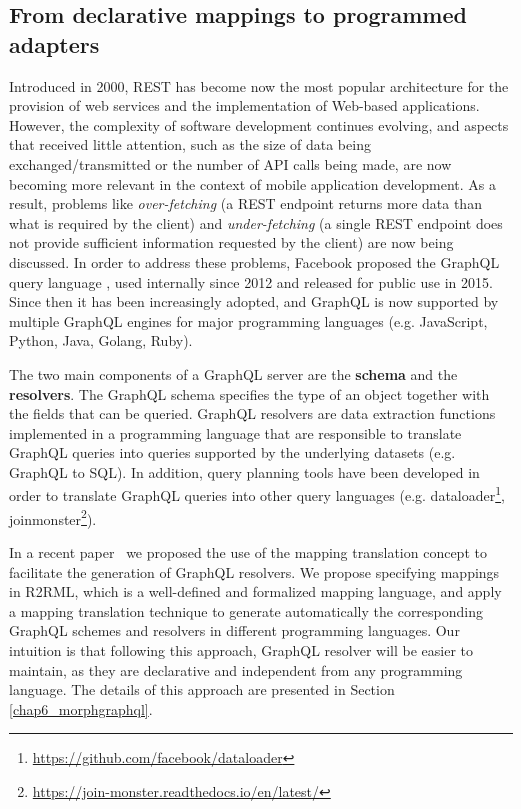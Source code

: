 \subsection{From declarative mappings to programmed adapters}
Introduced in 2000, REST \citep{fielding2000architectural} has become now the most popular architecture for the provision of web services and the implementation of Web-based applications. However, the complexity of software development continues evolving, and aspects that received little attention, such as the size of data being exchanged/transmitted or the number of API calls being made, are now becoming more relevant in the context of mobile application development. As a result, problems like \textit{over-fetching} (a REST endpoint returns more data than what is required by the client) and \textit{under-fetching} (a single REST endpoint does not provide sufficient information requested by the client) are now being discussed. In order to address these problems, Facebook proposed the GraphQL query language \citep{graphql}, used internally since 2012 and released for public use in 2015. Since then it has been increasingly adopted, and GraphQL is now supported by multiple GraphQL engines for major programming languages (e.g. JavaScript, Python, Java, Golang, Ruby).

The two main components of a GraphQL server are the \textbf{schema} and the \textbf{resolvers}. The GraphQL schema specifies the type of an object together with the fields that can be queried. GraphQL resolvers are data extraction functions implemented in a programming language that are responsible to translate GraphQL queries into queries supported by the underlying datasets (e.g. GraphQL to SQL). In addition, query planning tools have been developed in order to translate GraphQL queries into other query languages (e.g. dataloader\footnote{\url{https://github.com/facebook/dataloader}}, joinmonster\footnote{\url{https://join-monster.readthedocs.io/en/latest/}}).

In a recent paper~\citep{priyatna2019morph} we proposed the use of the mapping translation concept to facilitate the generation of GraphQL resolvers. We propose specifying mappings in R2RML, which is a well-defined and formalized mapping language, and apply a mapping translation technique to generate automatically the corresponding GraphQL schemes and resolvers in different programming languages. Our intuition is that following this approach, GraphQL resolver will be easier to maintain, as they are declarative and independent from any programming language. The details of this approach are presented in Section \ref{chap6_morphgraphql}.

